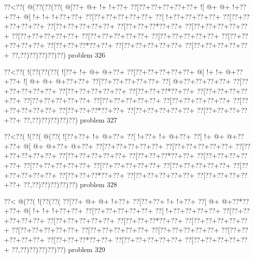 \vbox{\vbox{\goo
\0??<\0??(\- @(\0??(\0??(\0??(
\- @[\0??+\- @+\- !+\- !+\0??+
\0??[\0??+\0??+\0??+\0??+\0??+
\- ![\- @+\- @+\- !+\0??+\0??+
\- @[\- !+\- !+\- !+\0??+\0??+
\0??[\0??+\0??+\0??+\0??+\0??+
\0??[\- !+\0??+\0??+\0??+\0??+
\0??[\0??+\0??+\0??+\0??+\0??+
\0??[\0??+\0??+\0??+\0??+\0??+
\0??[\0??+\0??+\0??*\0??+\0??+
\0??[\0??+\0??+\0??+\0??+\0??+
\0??[\0??+\0??+\0??+\0??+\0??+
\0??[\0??+\0??+\0??+\0??+\0??+
\0??[\0??+\0??+\0??+\0??+\0??+
\0??[\0??+\0??+\0??+\0??+\0??+
\0??[\0??+\0??+\0??*\0??+\0??+
\0??[\0??+\0??+\0??+\0??+\0??+
\0??[\0??+\0??+\0??+\0??+\0??+
\0??,\0??)\0??)\0??)\0??)\0??)
}
\hfil problem 326\hfil\break
}

\vbox{\vbox{\goo
\0??<\0??(\- !(\0??(\0??(\0??(
\- ![\0??+\- !+\- @+\- @+\0??+
\0??[\0??+\0??+\0??+\0??+\0??+
\- @[\- !+\- !+\- @+\0??+\0??+
\- ![\- @+\- @+\- @+\0??+\0??+
\0??[\0??+\0??+\0??+\0??+\0??+
\0??[\- @+\0??+\0??+\0??+\0??+
\0??[\0??+\0??+\0??+\0??+\0??+
\0??[\0??+\0??+\0??+\0??+\0??+
\0??[\0??+\0??+\0??*\0??+\0??+
\0??[\0??+\0??+\0??+\0??+\0??+
\0??[\0??+\0??+\0??+\0??+\0??+
\0??[\0??+\0??+\0??+\0??+\0??+
\0??[\0??+\0??+\0??+\0??+\0??+
\0??[\0??+\0??+\0??+\0??+\0??+
\0??[\0??+\0??+\0??*\0??+\0??+
\0??[\0??+\0??+\0??+\0??+\0??+
\0??[\0??+\0??+\0??+\0??+\0??+
\0??,\0??)\0??)\0??)\0??)\0??)
}
\hfil problem 327\hfil\break
}

\vbox{\vbox{\goo
\0??<\0??(\- !(\0??(\- @(\0??(
\- ![\0??+\0??+\- !+\- @+\0??+
\0??[\- !+\0??+\- !+\- @+\0??+
\0??[\- !+\- @+\- @+\0??+\0??+
\- @[\- @+\- @+\0??+\- @+\0??+
\0??[\0??+\0??+\0??+\0??+\0??+
\0??[\0??+\0??+\0??+\0??+\0??+
\0??[\0??+\0??+\0??+\0??+\0??+
\0??[\0??+\0??+\0??+\0??+\0??+
\0??[\0??+\0??+\0??*\0??+\0??+
\0??[\0??+\0??+\0??+\0??+\0??+
\0??[\0??+\0??+\0??+\0??+\0??+
\0??[\0??+\0??+\0??+\0??+\0??+
\0??[\0??+\0??+\0??+\0??+\0??+
\0??[\0??+\0??+\0??+\0??+\0??+
\0??[\0??+\0??+\0??*\0??+\0??+
\0??[\0??+\0??+\0??+\0??+\0??+
\0??[\0??+\0??+\0??+\0??+\0??+
\0??,\0??)\0??)\0??)\0??)\0??)
}
\hfil problem 328\hfil\break
}

\vbox{\vbox{\goo
\0??<\- @(\0??(\- !(\0??(\0??(
\0??[\0??+\- @+\- @+\- !+\0??+
\0??[\0??+\0??+\- !+\- !+\0??+
\0??[\- @+\- @+\0??*\0??+\0??+
\- @[\- !+\- !+\- !+\0??+\0??+
\0??[\0??+\0??+\0??+\0??+\0??+
\0??[\- !+\0??+\0??+\0??+\0??+
\0??[\0??+\0??+\0??+\0??+\0??+
\0??[\0??+\0??+\0??+\0??+\0??+
\0??[\0??+\0??+\0??*\0??+\0??+
\0??[\0??+\0??+\0??+\0??+\0??+
\0??[\0??+\0??+\0??+\0??+\0??+
\0??[\0??+\0??+\0??+\0??+\0??+
\0??[\0??+\0??+\0??+\0??+\0??+
\0??[\0??+\0??+\0??+\0??+\0??+
\0??[\0??+\0??+\0??*\0??+\0??+
\0??[\0??+\0??+\0??+\0??+\0??+
\0??[\0??+\0??+\0??+\0??+\0??+
\0??,\0??)\0??)\0??)\0??)\0??)
}
\hfil problem 329\hfil\break
}

